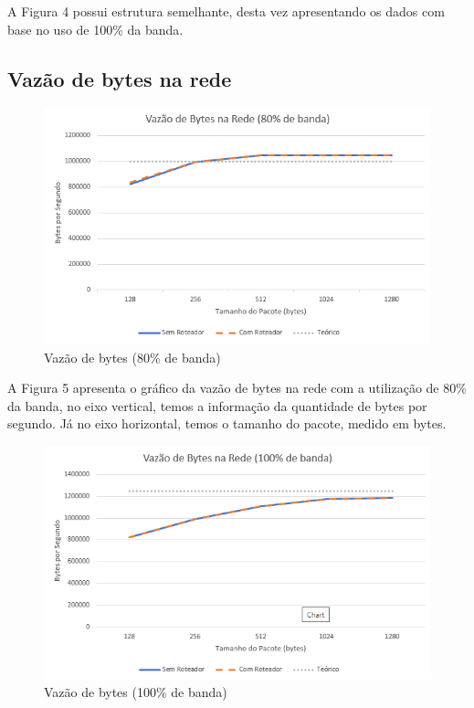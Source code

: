 \documentclass[12pt]{article}
\begin{document}
A Figura 4 possui estrutura semelhante, desta vez apresentando os dados com base no uso de 100\% da banda.

\subsection{Vazão de bytes na rede}

\begin{figure}[H]
\centering
\includegraphics[width=.9\textwidth]{vazao_bytes_80.png}
\caption{Vazão de bytes (80\% de banda)}
\label{fig:fig_com_roteador}
\end{figure}

A Figura 5 apresenta o gráfico da vazão de bytes na rede com a utilização de 80\% da banda, no eixo vertical, temos a informação da quantidade de bytes por segundo. Já no eixo horizontal, temos o tamanho do pacote, medido em bytes.

\begin{figure}[H]
\centering
\includegraphics[width=.9\textwidth]{vazao_bytes_100.png}
\caption{Vazão de bytes (100\% de banda)}
\label{fig:fig_com_roteador}
\end{figure}
\end{document}

